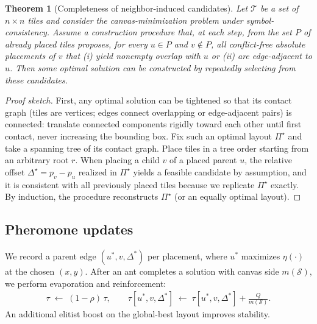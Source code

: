 \documentclass[11pt]{article}
\newtheorem{theorem}{Theorem}
\begin{document}
\begin{theorem}[Completeness of neighbor-induced candidates]
Let $\mathcal{T}$ be a set of $n\times n$ tiles and consider the canvas-minimization problem under symbol-consistency.
Assume a construction procedure that, at each step, from the set $P$ of already placed tiles proposes, for every $u\in P$ and $v\notin P$, all conflict-free absolute placements of $v$ that
(i) yield nonempty overlap with $u$ or (ii) are edge-adjacent to $u$.
Then some optimal solution can be constructed by repeatedly selecting from these candidates.
\end{theorem}

\begin{proof}[Proof sketch]
First, any optimal solution can be tightened so that its contact graph (tiles are vertices; edges connect overlapping or edge-adjacent pairs) is connected: translate connected components rigidly toward each other until first contact, never increasing the bounding box. Fix such an optimal layout $\Pi^\star$ and take a spanning tree of its contact graph. Place tiles in a tree order starting from an arbitrary root $r$. When placing a child $v$ of a placed parent $u$, the relative offset $\Delta^\star = p_v - p_u$ realized in $\Pi^\star$ yields a feasible candidate by assumption, and it is consistent with all previously placed tiles because we replicate $\Pi^\star$ exactly. By induction, the procedure reconstructs $\Pi^\star$ (or an equally optimal layout). 
\end{proof}


\subsection{Pheromone updates}
We record a parent edge $(u^*,v,\Delta^*)$ per placement, where $u^*$ maximizes $\eta(\cdot)$ at the chosen $(x,y)$. After an ant completes a solution with canvas side $m(\mathcal{S})$, we perform evaporation and reinforcement:
\begin{align}
 \tau \;\leftarrow\; (1-\rho)\,\tau,\qquad \tau[u^*,v,\Delta^*] \;\leftarrow\; \tau[u^*,v,\Delta^*] + \frac{Q}{m(\mathcal{S})}.
\end{align}
An additional elitist boost on the global-best layout improves stability.
\end{document}

